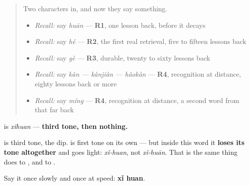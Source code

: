 \label{lesson:ZH-C28-xihuan}



\begin{quote}
Two characters in, and now they say something.

\begin{itemize}
\raggedright
  \item \emph{Recall:} say \emph{huān} — \textbf{R1}, one lesson back, before it decays
  \item \emph{Recall:} say \emph{hé} — \textbf{R2}, the first real retrieval, five to fifteen lessons back
  \item \emph{Recall:} say \emph{gè} — \textbf{R3}, durable, twenty to sixty lessons back
  \item \emph{Recall:} say \emph{kàn — kànjiàn — hǎokàn} — \textbf{R4}, recognition at distance, eighty lessons back or more
  \item \emph{Recall:} say \emph{míng} — \textbf{R4}, recognition at distance, a second word from that far back
\end{itemize}
\end{quote}

\begin{sounds}
\textbf{} is \emph{xǐhuan} — \textbf{third tone, then nothing.}

 is third tone, the dip.  is first tone on its own — but inside this word it \textbf{loses its tone altogether} and goes light: \emph{xǐ-huan}, not \emph{xǐ-huān}. That is the same thing  does to , and  to .

Say it once slowly and once at speed: \textbf{xǐ huan}.
\end{sounds}

